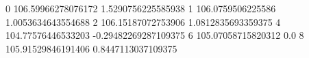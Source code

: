 0 106.59966278076172 1.5290756225585938
1 106.0759506225586 1.0053634643554688
2 106.15187072753906 1.0812835693359375
4 104.77576446533203 -0.29482269287109375
6 105.07058715820312 0.0
8 105.91529846191406 0.8447113037109375
